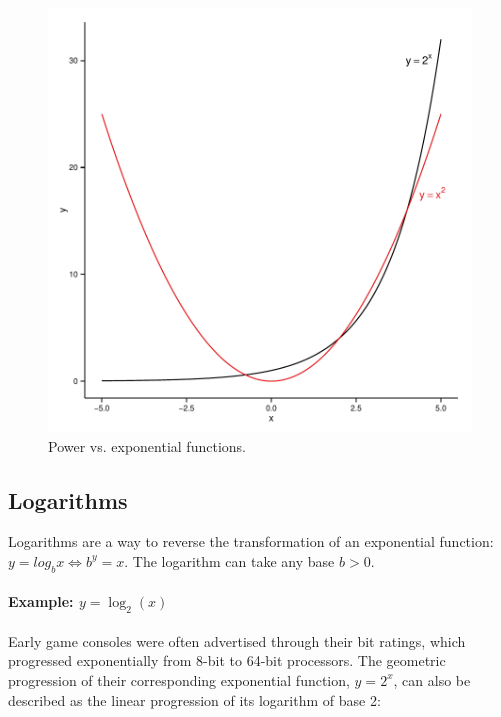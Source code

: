 \begin{knitrout}
\color{fgcolor}\begin{figure}[]

\includegraphics[width=\linewidth]{images/math-fun_powerexp} \caption{Power vs. exponential functions.\label{fig:fun_powerexp}}
\end{figure}


\end{knitrout}


\subsection{Logarithms}

Logarithms are a way to reverse the transformation of an exponential function: $y = log_b x \iff b^y = x$. The logarithm can take any base $b > 0$.

\paragraph{Example: $y = \log_2(x)$} %
%
Early game consoles were often advertised through their bit ratings, which progressed exponentially from 8-bit to 64-bit processors. The geometric progression of their corresponding exponential function, $y = 2^x$, can also be described as the linear progression of its logarithm of base 2:

